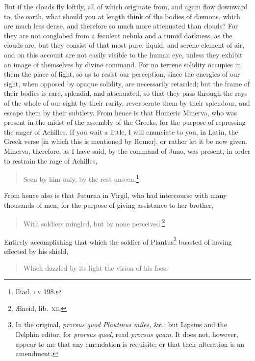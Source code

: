 \documentclass[12pt]{article}
\begin{document}
\noindent But if the clouds fly loftily, all of which originate from, and again
flow downward to, the earth, what should you at length think of the bodies of
d{\ae}mons, which are much less dense, and therefore so much more attenuated
than clouds? For they are not conglobed from a feculent nebula and a tumid
darkness, as the clouds are, but they consist of that most pure, liquid, and
serene element of air, and on this account are not easily visible to the human
eye, unless they exhibit an image of themselves by divine command. For no
terrene solidity occupies in them the place of light, so as to resist our
perception, since the energies of our sight, when opposed by opaque solidity,
are necessarily retarded; but the frame of their bodies is rare, splendid, and
attenuated, so that they pass through the rays of the whole of our sight by
their rarity, reverberate them by their splendour, and escape them by their
subtlety. From hence is that Homeric Minerva, who was present in the midst of
the assembly of the Greeks, for the purpose of repressing the anger of
Achilles. If you wait a little, I will enunciate to you, in Latin, the Greek
verse [in which this is mentioned by Homer], or rather let it be now given.
Minerva, therefore, as I have said, by the command of Juno, was present, in
order to restrain the rage of Achilles,

\begin{verse}
Seen by him only, by the rest unseen.\footnote{Iliad, \textsc{i} \textsc{v}
198.}
\end{verse}

\noindent From hence also is that Juturna in Virgil, who had intercourse
with many thousands of men, for the purpose of
giving assistance to her brother,

\begin{verse}
With soldiers mingled, but by none perceived.\footnote{{\AE}neid,
lib.~\textsc{xii}.}
\end{verse}

\noindent Entirely accomplishing that which the soldier of Plautus\footnote{In
the original, \textit{prorsus quod Plautinus miles,} \&c.; but Lipsius and the
Delphin editor, for \textit{prorsus quod}, read \textit{prorsus quam}. It does
not, however, appear to me that any emendation is requisite; or that
their alteration is an amendment.} boasted of having effected by his shield,

\begin{verse}
Which dazzled by its light the vision of his foes.
\end{verse}
\end{document}
